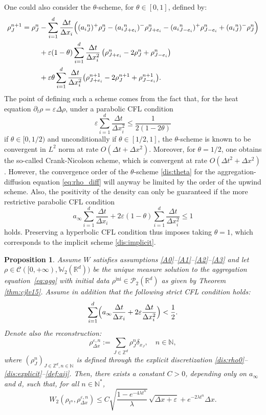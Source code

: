 \documentclass[11pt]{article}
\numberwithin{equation}{section}
\newcommand{\ini}{\mathrm{ini}}
\def\NN{\mathbb{N}}
\def\RR{\mathbb{R}}
\def\ZZ{\mathbb{Z}}
\def\WW{\mathbb{W}}
\def\eps{\varepsilon}
\def\pa{\partial}
\def\dt{\Delta t}
\def\dx{\Delta x}
\def\calC{{\mathcal C}}
\def\calP{{\mathcal P}}
\theoremstyle{plain}
\newtheorem{prop}[theorem]{Proposition}
\theoremstyle{definition}
\begin{document}
One could also consider the $\theta$-scheme, for $\theta \in [0,1]$, defined by:
\begin{align}\label{dis:theta}
\rho_{J}^{n+1} = \rho_{J}^n &- \sum_{i=1}^{d} \frac{\dt}{\dx_i}
\Big(({a_i}^n_{J})^+ \rho_{J}^n - ({a_i}^n_{J+e_i})^- \rho_{J+e_i}^n
-({a_i}^n_{J-e_i})^+ \rho_{J-e_i}^n + ({a_i}^n_{J})^- \rho_{J}^n \Big)\notag \\
& + \eps (1-\theta) \sum_{i=1}^{d} \frac{\dt}{\dx_i^2} \left(\rho_{J+e_i}^n - 2\rho_J^n + \rho_{J-e_i}^n \right) \\
& + \eps \theta \sum_{i=1}^{d} \frac{\dt}{\dx_i^2} \bigl(\rho_{J+e_i}^{n+1} - 2\rho_J^{n+1} + \rho_{J-e_i}^{n+1} \bigr).\notag
\end{align}
The point of defining such a scheme comes from the fact that, for the heat equation $\pa_t \rho = \eps \Delta \rho$, under a parabolic CFL condition
\[
\eps \sum_{i=1}^{d} \frac{\dt}{\dx_i^2} \leq \frac{1}{2(1-2\theta)}
\]
if $\theta \in [0, 1/2)$ and unconditionally if $\theta \in [1/2, 1]$, the $\theta$-scheme is known to be convergent in $L^2$ norm at rate $O(\dt + \dx^2)$. Moreover, for $\theta = 1/2$, one obtains the so-called Crank-Nicolson scheme, which is convergent at rate $O(\dt^2 + \dx^2)$.
However, the convergence order of the $\theta$-scheme \eqref{dis:theta} for the aggregation-diffusion equation \eqref{eq:rho_diff} will anyway be limited by the order of the upwind scheme. Also, the positivity of the density can only be guaranteed if the more restrictive parabolic CFL condition
\[
a_\infty \sum_{i=1}^{d} \frac{\dt}{\dx_i} + 2\eps (1-\theta) \sum_{i=1}^{d} \frac{\dt}{\dx_i^2} \leq 1
\]
holds. Preserving a hyperbolic CFL condition thus imposes taking $\theta = 1$, which corresponds to the implicit scheme \eqref{dis:implicit}.

\begin{prop}\label{prop:cvOrder1/2:scheme}
Assume $W$ satisfies assumptions \eqref{A0}--\eqref{A1}--\eqref{A2}--\eqref{A3} and let $\rho \in \calC([0,+\infty), \WW_2(\RR^d))$ be the unique measure solution to the aggregation equation~\eqref{eq:agg} with initial data $\rho^{\ini} \in \calP_2(\RR^d)$ as
given by Theorem \ref{thm:cjlv15}. Assume in addition that the following strict CFL condition holds:
\begin{equation}
\label{CFL}
\sum_{i=1}^d \Bigl(a_\infty \frac{\dt}{\dx_i} + 2\eps \frac{\dt}{\dx_i^2}\Bigr) < \frac 12.
\end{equation}
Denote also the reconstruction:
\[
\rho_{\dx}^{\eps,n} := \sum_{J\in \ZZ^d} \rho_J^n \delta_{x_J},
\quad n \in {\mathbb N},
\]
where $(\rho_J^n)_{J\in \ZZ^d, n \in \mathbb N}$ is defined through the explicit discretization
\eqref{dis:rho0}--\eqref{dis:explicit}--\eqref{def:aij}.
Then, there exists a constant $C>0$, depending only on $a_\infty$ and $d$, such that, for all $n\in \NN^*$,
\begin{equation}
\label{eq:cvOrder1/2:scheme:bound:1}
W_2(\rho_{t^n},\rho_{\dx}^{\eps,n} ) \leq C \sqrt{\frac{1 - e^{-4\lambda t^n}}{\lambda}}\, \sqrt{\dx + \eps} + e^{-2\lambda t^n} \dx.
\end{equation}
\end{prop}
\end{document}
